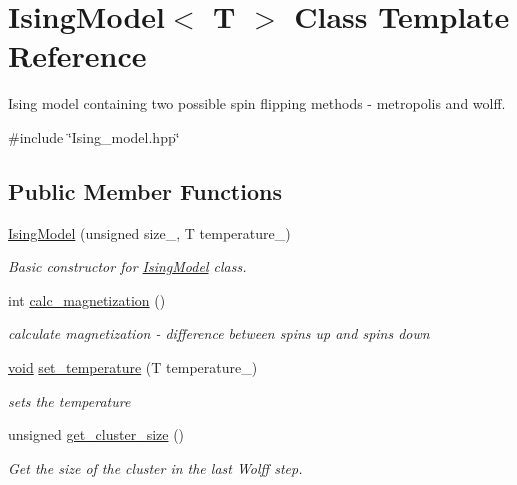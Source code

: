 \hypertarget{classIsingModel}{}\section{Ising\+Model$<$ T $>$ Class Template Reference}
\label{classIsingModel}


Ising model containing two possible spin flipping methods -\/ metropolis and wolff.  




{\ttfamily \#include \char`\"{}Ising\+\_\+model.\+hpp\char`\"{}}

\subsection*{Public Member Functions}
\begin{DoxyCompactItemize}
\item 
\mbox{\hyperlink{classIsingModel_a3c9a903d3ddada5ce514ba66f99b0282}{Ising\+Model}} (unsigned size\+\_, T temperature\+\_)
\begin{DoxyCompactList}\small\item\em Basic constructor for \mbox{\hyperlink{classIsingModel}{Ising\+Model}} class. \end{DoxyCompactList}\item 
int \mbox{\hyperlink{classIsingModel_a349a13b847fb221eec7043fc53649640}{calc\+\_\+magnetization}} ()
\begin{DoxyCompactList}\small\item\em calculate magnetization -\/ difference between spins up and spins down \end{DoxyCompactList}\item 
\mbox{\hyperlink{glad_8h_a950fc91edb4504f62f1c577bf4727c29}{void}} \mbox{\hyperlink{classIsingModel_abbd5b7935830eca268b7eacc94478649}{set\+\_\+temperature}} (T temperature\+\_\+)
\begin{DoxyCompactList}\small\item\em sets the temperature \end{DoxyCompactList}\item 
unsigned \mbox{\hyperlink{classIsingModel_afd731e5858b03deb1c8a11ee8a6b8834}{get\+\_\+cluster\+\_\+size}} ()
\begin{DoxyCompactList}\small\item\em Get the size of the cluster in the last Wolff step. \end{DoxyCompactList}\item 

\end{DoxyCompactItemize}
